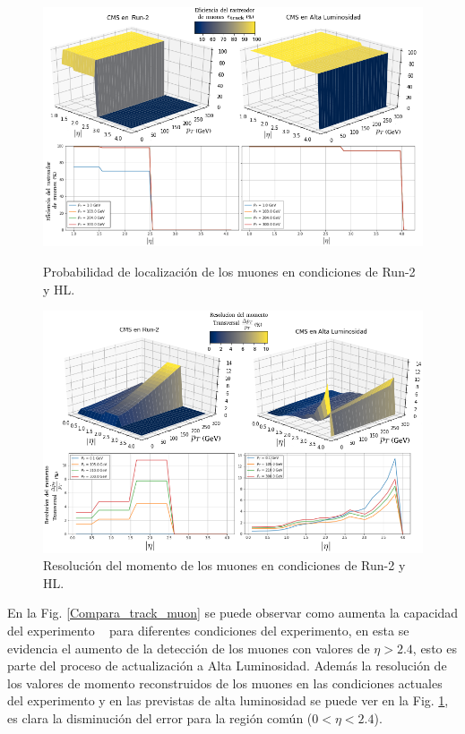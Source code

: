 \begin{figure}[!t]
\centering
\includegraphics[width=.90\textwidth]{Analisis_y_Resultados/imagenes/Tracking_of_Muon.png}
\caption{Probabilidad de localización de los muones en condiciones de Run-2 y HL.}
\label{Compara_track_muon}
\includegraphics[width=.90\textwidth]{Analisis_y_Resultados/imagenes/Momentum_resolution_of_Muon.png}
\caption{Resolución del momento de los muones en condiciones de Run-2 y HL.}
\label{Compara_sol_muon}
\end{figure}
En la Fig. \ref{Compara_track_muon} se puede observar como aumenta la capacidad del experimento \CMS ~ para diferentes condiciones del experimento, en esta se evidencia el aumento de la detección de los muones con valores de $\eta > 2.4$, esto es parte del proceso de actualización a Alta Luminosidad. Además la resolución de los valores de momento reconstruidos de los muones en las condiciones actuales del experimento y en las previstas de alta luminosidad se puede ver en la Fig. \ref{Compara_sol_muon}, es clara la disminución del error para la región común ($0<\eta < 2.4$).

